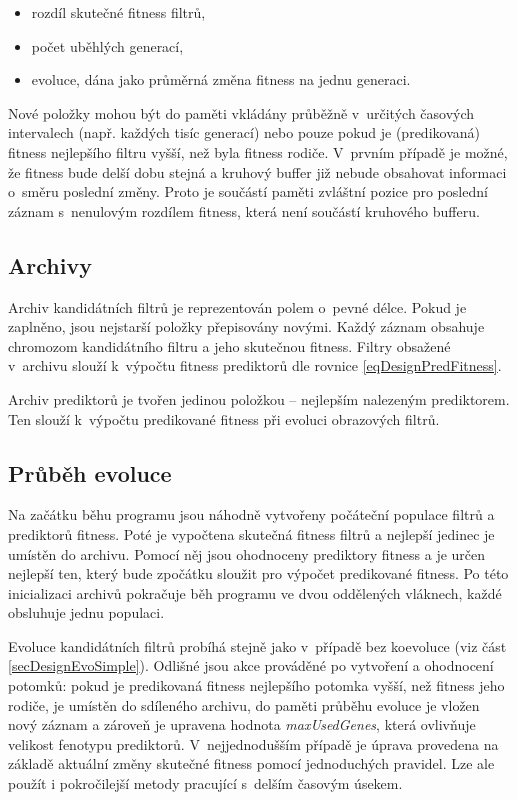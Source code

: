 \begin{itemize}
    \item rozdíl skutečné fitness filtrů,
    \item počet uběhlých generací,
    \item {} evoluce, dána jako průměrná změna fitness na jednu generaci.
\end{itemize}

Nové položky mohou být do paměti vkládány průběžně v~určitých časových intervalech (např. každých tisíc generací) nebo pouze pokud je (predikovaná) fitness nejlepšího filtru vyšší, než byla fitness rodiče. V~prvním případě je možné, že fitness bude delší dobu stejná a kruhový buffer již nebude obsahovat informaci o~směru poslední změny. Proto je součástí paměti zvláštní pozice pro poslední záznam s~nenulovým rozdílem fitness, která není součástí kruhového bufferu.

\subsection{Archivy}

Archiv kandidátních filtrů je reprezentován polem o~pevné délce. Pokud je zaplněno, jsou nejstarší položky přepisovány novými. Každý záznam obsahuje chromozom kandidátního filtru a jeho skutečnou fitness. Filtry obsažené v~archivu slouží k~výpočtu fitness prediktorů dle rovnice \ref{eqDesignPredFitness}.

Archiv prediktorů je tvořen jedinou položkou -- nejlepším nalezeným prediktorem. Ten slouží k~výpočtu predikované fitness při evoluci obrazových filtrů.

\subsection{Průběh evoluce}

Na začátku běhu programu jsou náhodně vytvořeny počáteční populace filtrů a prediktorů fitness. Poté je vypočtena skutečná fitness filtrů a nejlepší jedinec je umístěn do archivu. Pomocí něj jsou ohodnoceny prediktory fitness a je určen nejlepší ten, který bude zpočátku sloužit pro výpočet predikované fitness. Po této inicializaci archivů pokračuje běh programu ve dvou oddělených vláknech, každé obsluhuje jednu populaci.

Evoluce kandidátních filtrů probíhá stejně jako v~případě bez koevoluce (viz část \ref{secDesignEvoSimple}). Odlišné jsou akce prováděné po vytvoření a ohodnocení potomků: pokud je predikovaná fitness nejlepšího potomka vyšší, než fitness jeho rodiče, je umístěn do sdíleného archivu, do paměti průběhu evoluce je vložen nový záznam a zároveň je upravena hodnota \emph{maxUsedGenes}, která ovlivňuje velikost fenotypu prediktorů. V~nejjednodušším případě je úprava provedena na základě aktuální změny skutečné fitness pomocí jednoduchých pravidel. Lze ale použít i pokročilejší metody pracující s~delším časovým úsekem.

